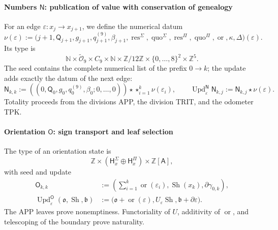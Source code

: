 \paragraph{Numbers \(\mathsf N\): publication of value with conservation of genealogy}
For an edge \(\varepsilon:x_j\to x_{j+1}\), we define the numerical datum
\begin{equation}
\label{eq:pdfv2-terminal-numero-arista}
 \nu(\varepsilon):=
 \bigl(j+1,\mathsf Q_{j+1},g_{j+1},q^{(9)}_{j+1},\beta_{j+1},
 \operatorname{res}^{\Sigma},\operatorname{quo}^{\Sigma},
 \operatorname{res}^{\Pi},\operatorname{quo}^{\Pi},
 \operatorname{or},\kappa,\Delta\bigr)(\varepsilon).
\end{equation}
Its type is
\[
 \mathbb N\times\widetilde{\mathcal O}_9\times C_9\times\mathbb N
 \times\mathbb Z/12\mathbb Z
 \times\{0,\ldots,8\}^2\times\mathbb Z^5.
\]
The seed contains the complete numerical list of the prefix \(0\to k\);
the update adds exactly the datum of the next edge:
\begin{equation}
\label{eq:pdfv2-terminal-update-n}
 \mathsf N_{k,k}:=
 ((0,\mathsf Q_0,g_0,q^{(9)}_0,\beta_0;0,\ldots,0))
 \star\mathop{\star}_{i=1}^{k}\nu(\varepsilon_i),\qquad
 \operatorname{Upd}^{\mathsf N}_{\varepsilon}\mathsf N_{k,j}
 :=\mathsf N_{k,j}\star\nu(\varepsilon).
\end{equation}
Totality proceeds from the divisions APP, the division TRIT, and the odometer TPK.

\paragraph{Orientation \(\mathsf O\): sign transport and leaf selection}
The type of an orientation state is
\[
 \mathbb Z\times
 (\mathsf H^\Sigma_x\oplus\mathsf H^\Pi_x)
 \times\mathbb Z[\mathsf A],
\]
with seed and update
\begin{align}
 \mathsf O_{k,k}&:=
 \left(\sum_{i=1}^{k}\operatorname{or}(\varepsilon_i),
       \operatorname{Sh}(x_k),\partial\gamma_{0,k}\right),
 \label{eq:pdfv2-terminal-semilla-o}\\
 \operatorname{Upd}^{\mathsf O}_{\varepsilon}
 (\mathfrak o,\operatorname{Sh},\mathfrak b)
 &:=
 \bigl(\mathfrak o+\operatorname{or}(\varepsilon),
 U_\varepsilon\operatorname{Sh},
 \mathfrak b+\partial\varepsilon\bigr).
 \label{eq:pdfv2-terminal-update-o}
\end{align}
The APP leaves prove nonemptiness. Functoriality of \(U\), additivity of
\(\operatorname{or}\), and telescoping of the boundary prove naturality.

